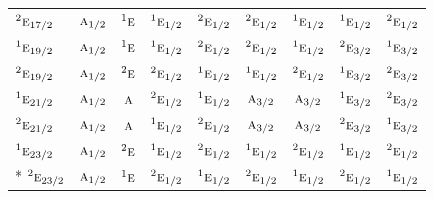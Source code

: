 \documentclass[10pt,a4paper]{article}
\numberwithin{equation}{section}
\newcommand{\irr}[1]{\text{\normalfont\scshape #1}}
\newcommand{\conjpair}[1]{{}^{#1}}
\begin{document}
{\begin{longtable}{@{}lcccccccc@{}}
$\conjpair{2}\irr{e}_{17/2}$ & $\irr{a}_{1/2}$ & $\conjpair{1}\irr{e}$ & $\conjpair{1}\irr{e}_{1/2}$ & $\conjpair{2}\irr{e}_{1/2}$ & $\conjpair{2}\irr{e}_{1/2}$ & $\conjpair{1}\irr{e}_{1/2}$ & $\conjpair{1}\irr{e}_{1/2}$ & $\conjpair{2}\irr{e}_{1/2}$\\
$\conjpair{1}\irr{e}_{19/2}$ & $\irr{a}_{1/2}$ & $\conjpair{1}\irr{e}$ & $\conjpair{1}\irr{e}_{1/2}$ & $\conjpair{2}\irr{e}_{1/2}$ & $\conjpair{2}\irr{e}_{1/2}$ & $\conjpair{1}\irr{e}_{1/2}$ & $\conjpair{2}\irr{e}_{3/2}$ & $\conjpair{1}\irr{e}_{3/2}$\\
$\conjpair{2}\irr{e}_{19/2}$ & $\irr{a}_{1/2}$ & $\conjpair{2}\irr{e}$ & $\conjpair{2}\irr{e}_{1/2}$ & $\conjpair{1}\irr{e}_{1/2}$ & $\conjpair{1}\irr{e}_{1/2}$ & $\conjpair{2}\irr{e}_{1/2}$ & $\conjpair{1}\irr{e}_{3/2}$ & $\conjpair{2}\irr{e}_{3/2}$\\
$\conjpair{1}\irr{e}_{21/2}$ & $\irr{a}_{1/2}$ & $\irr{a}$ & $\conjpair{2}\irr{e}_{1/2}$ & $\conjpair{1}\irr{e}_{1/2}$ & $\irr{a}_{3/2}$ & $\irr{a}_{3/2}$ & $\conjpair{1}\irr{e}_{3/2}$ & $\conjpair{2}\irr{e}_{3/2}$\\
$\conjpair{2}\irr{e}_{21/2}$ & $\irr{a}_{1/2}$ & $\irr{a}$ & $\conjpair{1}\irr{e}_{1/2}$ & $\conjpair{2}\irr{e}_{1/2}$ & $\irr{a}_{3/2}$ & $\irr{a}_{3/2}$ & $\conjpair{2}\irr{e}_{3/2}$ & $\conjpair{1}\irr{e}_{3/2}$\\
$\conjpair{1}\irr{e}_{23/2}$ & $\irr{a}_{1/2}$ & $\conjpair{2}\irr{e}$ & $\conjpair{1}\irr{e}_{1/2}$ & $\conjpair{2}\irr{e}_{1/2}$ & $\conjpair{1}\irr{e}_{1/2}$ & $\conjpair{2}\irr{e}_{1/2}$ & $\conjpair{1}\irr{e}_{1/2}$ & $\conjpair{2}\irr{e}_{1/2}$\\*
$\conjpair{2}\irr{e}_{23/2}$ & $\irr{a}_{1/2}$ & $\conjpair{1}\irr{e}$ & $\conjpair{2}\irr{e}_{1/2}$ & $\conjpair{1}\irr{e}_{1/2}$ & $\conjpair{2}\irr{e}_{1/2}$ & $\conjpair{1}\irr{e}_{1/2}$ & $\conjpair{2}\irr{e}_{1/2}$ & $\conjpair{1}\irr{e}_{1/2}$\\
\bottomrule\end{longtable}}
\end{document}
